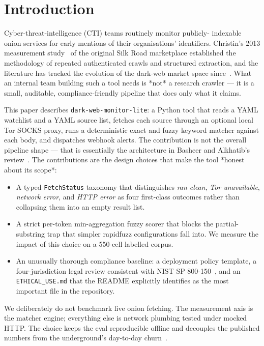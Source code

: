 \documentclass[conference]{IEEEtran}
\begin{document}
\section{Introduction}

Cyber-threat-intelligence (CTI) teams routinely monitor publicly-
indexable onion services for early mentions of their organisations'
identifiers. Christin's 2013 measurement
study~\cite{christin2013silkroad} of the original Silk Road
marketplace established the methodology of repeated authenticated
crawls and structured extraction, and the literature has tracked
the evolution of the dark-web market space since~\cite{basheer2021review,
dalvi2024darkweb}. What an internal team building such a tool
needs is *not* a research crawler --- it is a small, auditable,
compliance-friendly pipeline that does only what it claims.

This paper describes \texttt{dark-web-monitor-lite}: a Python tool
that reads a YAML watchlist and a YAML source list, fetches each
source through an optional local Tor SOCKS proxy, runs a
deterministic exact and fuzzy keyword matcher against each body,
and dispatches webhook alerts. The contribution is not the
overall pipeline shape --- that is essentially the architecture in
Basheer and Alkhatib's
review~\cite{basheer2021review}. The contributions are the design
choices that make the tool *honest about its scope*:

\begin{itemize}
  \item A typed \texttt{FetchStatus} taxonomy that distinguishes
        \emph{ran clean}, \emph{Tor unavailable}, \emph{network
        error}, and \emph{HTTP error} as four first-class outcomes
        rather than collapsing them into an empty result list.
  \item A strict per-token min-aggregation fuzzy scorer that
        blocks the partial-substring trap that simpler rapidfuzz
        configurations fall into. We measure the impact of this
        choice on a 550-cell labelled corpus.
  \item An unusually thorough compliance baseline: a deployment
        policy template, a four-jurisdiction legal review
        consistent with NIST SP 800-150~\cite{nist_sp_800_150},
        and an \texttt{ETHICAL\_USE.md} that the README
        explicitly identifies as the most important file in the
        repository.
\end{itemize}

We deliberately do not benchmark live onion fetching. The
measurement axis is the matcher engine; everything else is
network plumbing tested under mocked HTTP. The choice keeps the
eval reproducible offline and decouples the published numbers
from the underground's day-to-day churn~\cite{owen2016tor}.
\end{document}
